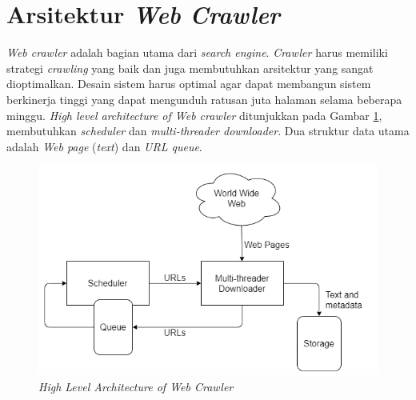 \section{Arsitektur \emph{Web Crawler}}

\emph{Web crawler} adalah bagian utama dari \emph{search engine}. \emph{Crawler} harus memiliki strategi \emph{crawling} yang baik dan juga membutuhkan arsitektur yang sangat dioptimalkan. Desain sistem harus optimal agar dapat membangun sistem berkinerja tinggi yang dapat mengunduh ratusan juta halaman selama beberapa minggu. \emph{High level architecture of Web crawler} ditunjukkan pada Gambar \ref{gambar:architecture_webcrawler}, membutuhkan \emph{scheduler} dan \emph{multi-threader downloader}. Dua struktur data utama adalah \emph{Web page} (\emph{text}) dan \emph{URL queue}.

\begin{figure}[H]
	\centering
	\includegraphics[keepaspectratio, width=12cm]{gambar/Arsitektur_Webcrawler}
	\caption{\emph{High Level Architecture of Web Crawler}~\cite{castillo2005effective}}
	\label{gambar:architecture_webcrawler}
\end{figure}

